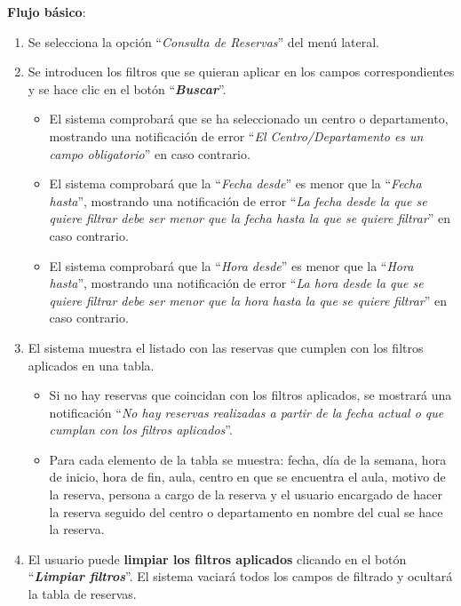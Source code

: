 \textbf{Flujo básico}:
    \begin{enumerate}
        \item Se selecciona la opción ``\textit{Consulta de Reservas}'' del menú lateral.
        
        \item Se introducen los filtros que se quieran aplicar en los campos correspondientes y se hace clic en el botón ``\textbf{\textit{Buscar}}''.
            \begin{itemize}
            \tightlist
                \item El sistema comprobará que se ha seleccionado un centro o departamento, mostrando una notificación de error ``\textit{El Centro/Departamento es un campo obligatorio}'' en caso contrario.
                
                \item El sistema comprobará que la ``\textit{Fecha desde}'' es menor que la ``\textit{Fecha hasta}'', mostrando una notificación de error ``\textit{La fecha desde la que se quiere filtrar debe ser menor que la fecha hasta la que se quiere filtrar}'' en caso contrario.
                
                \item El sistema comprobará que la ``\textit{Hora desde}'' es menor que la ``\textit{Hora hasta}'', mostrando una notificación de error ``\textit{La hora desde la que se quiere filtrar debe ser menor que la hora hasta la que se quiere filtrar}'' en caso contrario.
            \end{itemize}
            
        \item El sistema muestra el listado con las reservas que cumplen con los filtros aplicados en una tabla.
            \begin{itemize}
            \tightlist
                \item Si no hay reservas que coincidan con los filtros aplicados, se mostrará una notificación ``\textit{No hay reservas realizadas a partir de la fecha actual o que cumplan con los filtros aplicados}''.
                
                \item Para cada elemento de la tabla se muestra: fecha, día de la semana, hora de inicio, hora de fin, aula, centro en que se encuentra el aula, motivo de la reserva, persona a cargo de la reserva y el usuario encargado de hacer la reserva seguido del centro o departamento en nombre del cual se hace la reserva.
            \end{itemize}
            
        \item El usuario puede \textbf{limpiar los filtros aplicados} clicando en el botón ``\textbf{\textit{Limpiar filtros}}''. El sistema vaciará todos los campos de filtrado y ocultará la tabla de reservas.
            
    \end{enumerate}

